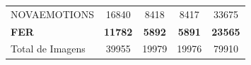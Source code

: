 \documentclass{beamer}
\begin{document}
\begin{frame}
\begin{table}
\begin{tabular}{lcccc}
NOVAEMOTIONS           & 16840                                       & 8418                                       & 8417                                           & 33675                                         \\
\textbf{FER}                    & \textbf{11782}                                       & \textbf{5892}                                       & \textbf{5891}                                           & \textbf{23565}                                         \\
Total de Imagens       & 39955                                       & 19979                                      & 19976                                          & 79910                                         \\ \hline
\end{tabular}
\end{table}
\end{frame}
\end{document}
